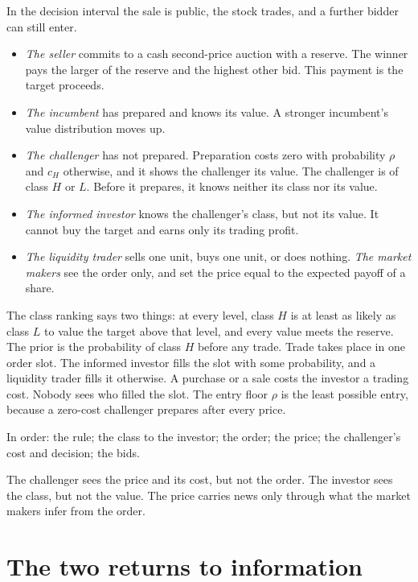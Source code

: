 In the decision interval the sale is public, the stock trades, and a further bidder can still enter.
\begin{itemize}[nosep]
\item \emph{The seller} commits to a cash second-price auction with a reserve. The winner pays the larger of the
reserve and the highest other bid. This payment is the target proceeds.
\item \emph{The incumbent} has prepared and knows its value. A stronger incumbent's value distribution moves up.
\item \emph{The challenger} has not prepared. Preparation costs zero with probability \(\rho\) and \(c_H\)
otherwise, and it shows the challenger its value. The challenger is of class \(H\) or \(L\). Before it prepares, it knows neither its class nor its value.
\item \emph{The informed investor} knows the challenger's class, but not its value. It cannot buy the target and
earns only its trading profit.
\item \emph{The liquidity trader} sells one unit, buys one unit, or does nothing. \emph{The market makers} see the
order only, and set the price equal to the expected payoff of a share.
\end{itemize}
The class ranking says two things: at every level, class \(H\) is at least as likely as class \(L\) to value the
target above that level, and every value meets the reserve. The prior is the probability of class \(H\) before any
trade. Trade takes place in one order slot. The informed investor fills the slot with some
probability, and a liquidity trader fills it otherwise. A purchase or a sale costs the investor a trading cost.
Nobody sees who filled the slot. The entry floor \(\rho\) is the least possible
entry, because a zero-cost challenger prepares after every price.

In order: the rule; the class to the investor; the order; the price; the challenger's cost and decision; the bids.

\begin{watchout}
The challenger sees the price and its cost, but not the order. The investor sees the class, but not the value. The
price carries news only through what the market makers infer from the order.
\end{watchout}

\section{The two returns to information}\label{sec:story-returns}

